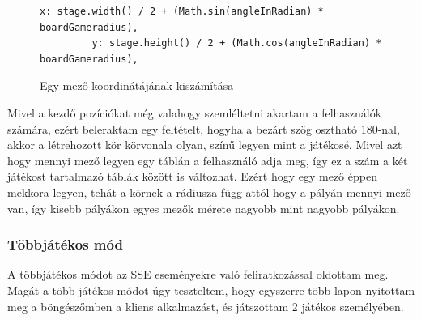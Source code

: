 \documentclass[a4paper,twoside]{article}
\begin{document}
\begin{figure}
	\caption{Egy mező koordinátájának kiszámítása}
	\begin{minipage}{\textwidth}
		\begin{lstlisting}[style=javascriptStyle]
		 x: stage.width() / 2 + (Math.sin(angleInRadian) * boardGameradius),
	   	 y: stage.height() / 2 + (Math.cos(angleInRadian) * boardGameradius),
		\end{lstlisting}
	\end{minipage}
	
	\label{kettesPlayerKoord}
\end{figure}

Mivel a kezdő pozíciókat még valahogy szemléltetni akartam a felhasználók számára, ezért beleraktam egy feltételt, hogyha a bezárt szög osztható 180-nal, akkor a létrehozott kör körvonala olyan, színű legyen mint a játékosé. Mivel azt hogy mennyi mező legyen egy táblán a felhasználó adja meg, így ez a szám a két játékost tartalmazó táblák között is változhat. Ezért hogy egy mező éppen mekkora legyen, tehát a körnek a rádiusza függ attól hogy a pályán mennyi mező van, így kisebb pályákon egyes mezők mérete nagyobb mint nagyobb pályákon.
\subsubsection{Többjátékos mód}
A többjátékos módot az SSE eseményekre való feliratkozással oldottam meg. Magát a több játékos módot úgy teszteltem, hogy egyszerre több lapon nyitottam meg a böngészőmben a
kliens alkalmazást, és játszottam 2 játékos személyében. 
\end{document}
